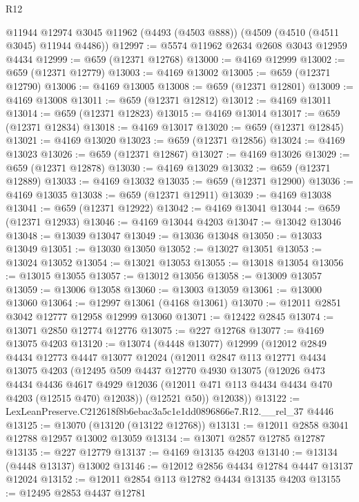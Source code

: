 \begin{lexlean}{R12}
\begin{coremodule}
    @11944
    @12974
    @3045
    @11962
    (@4493 (@4503 @888))
    (@4509 (@4510 (@4511 @3045) @11944 @4486))
@12997 := @5574 @11962 @2634 @2608 @3043 @12959 @4434
@12999 := @659 (@12371 @12768)
@13000 := @4169 @12999
@13002 := @659 (@12371 @12779)
@13003 := @4169 @13002
@13005 := @659 (@12371 @12790)
@13006 := @4169 @13005
@13008 := @659 (@12371 @12801)
@13009 := @4169 @13008
@13011 := @659 (@12371 @12812)
@13012 := @4169 @13011
@13014 := @659 (@12371 @12823)
@13015 := @4169 @13014
@13017 := @659 (@12371 @12834)
@13018 := @4169 @13017
@13020 := @659 (@12371 @12845)
@13021 := @4169 @13020
@13023 := @659 (@12371 @12856)
@13024 := @4169 @13023
@13026 := @659 (@12371 @12867)
@13027 := @4169 @13026
@13029 := @659 (@12371 @12878)
@13030 := @4169 @13029
@13032 := @659 (@12371 @12889)
@13033 := @4169 @13032
@13035 := @659 (@12371 @12900)
@13036 := @4169 @13035
@13038 := @659 (@12371 @12911)
@13039 := @4169 @13038
@13041 := @659 (@12371 @12922)
@13042 := @4169 @13041
@13044 := @659 (@12371 @12933)
@13046 := @4169 @13044 @4203
@13047 := @13042 @13046
@13048 := @13039 @13047
@13049 := @13036 @13048
@13050 := @13033 @13049
@13051 := @13030 @13050
@13052 := @13027 @13051
@13053 := @13024 @13052
@13054 := @13021 @13053
@13055 := @13018 @13054
@13056 := @13015 @13055
@13057 := @13012 @13056
@13058 := @13009 @13057
@13059 := @13006 @13058
@13060 := @13003 @13059
@13061 := @13000 @13060
@13064 := @12997 @13061 (@4168 @13061)
@13070 := @12011 @2851 @3042 @12777 @12958 @12999 @13060
@13071 := @12422 @2845
@13074 := @13071 @2850 @12774 @12776
@13075 := @227 @12768
@13077 := @4169 @13075 @4203
@13120 := @13074
    (@4448 @13077)
    @12999
    (@12012
      @2849
      @4434
      @12773
      @4447
      @13077
      @12024
      (@12011
        @2847
        @113
        @12771
        @4434
        @13075
        @4203
        (@12495
          @509
          @4437
          @12770
          @4930
          @13075
          (@12026
            @473
            @4434
            @4436
            @4617
            @4929
            @12036
            (@12011 @471 @113 @4434 @4434 @470 @4203 (@12515 @470) @12038))
          (@12521 @50))
        @12038))
@13122 := LexLeanPreserve.C212618f8b6ebac3a5c1e1dd0896866e7.R12.__rel_37 @4446
@13125 := @13070 (@13120 (@13122 @12768))
@13131 := @12011 @2858 @3041 @12788 @12957 @13002 @13059
@13134 := @13071 @2857 @12785 @12787
@13135 := @227 @12779
@13137 := @4169 @13135 @4203
@13140 := @13134 (@4448 @13137) @13002
@13146 := @12012 @2856 @4434 @12784 @4447 @13137 @12024
@13152 := @12011 @2854 @113 @12782 @4434 @13135 @4203
@13155 := @12495 @2853 @4437 @12781

\end{coremodule}
\end{lexlean}
